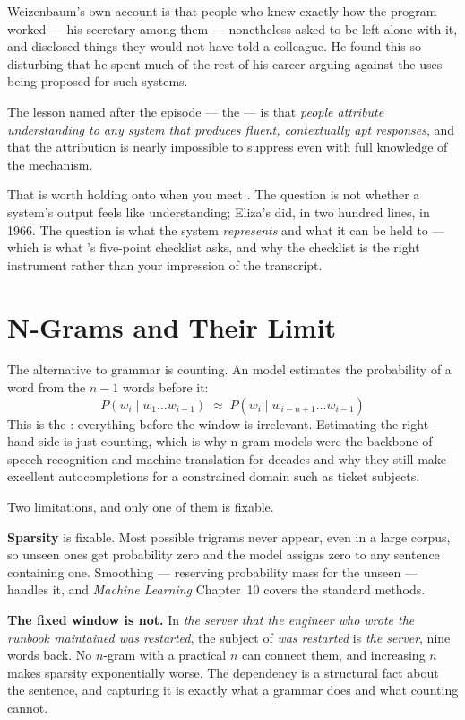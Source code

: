 \begin{alertbox}
Weizenbaum's own account is that people who knew exactly how the program worked ---
his secretary among them --- nonetheless asked to be left alone with it, and
disclosed things they would not have told a colleague. He found this so disturbing
that he spent much of the rest of his career arguing against the uses being proposed
for such systems.

The lesson named after the episode --- the  --- is that
\emph{people attribute understanding to any system that produces fluent,
contextually apt responses}, and that the attribution is nearly impossible to
suppress even with full knowledge of the mechanism.

That is worth holding onto when you meet . The question is not whether
a system's output feels like understanding; Eliza's did, in two hundred lines, in
1966. The question is what the system \emph{represents} and what it can be held to
--- which is what 's five-point checklist asks, and why the
checklist is the right instrument rather than your impression of the transcript.
\end{alertbox}

\section{N-Grams and Their Limit}

The alternative to grammar is counting. An  model estimates the
probability of a word from the $n-1$ words before it:
\[
  P(w_{i} \mid w_{1} \ldots w_{i-1}) \;\approx\;
  P(w_{i} \mid w_{i-n+1} \ldots w_{i-1})
\]
This is the : everything before the window is irrelevant.
Estimating the right-hand side is just counting, which is why n-gram models were
the backbone of speech recognition and machine translation for decades and why they
still make excellent autocompletions for a constrained domain such as ticket
subjects.

Two limitations, and only one of them is fixable.

\textbf{Sparsity} is fixable. Most possible trigrams never appear, even in a large
corpus, so unseen ones get probability zero and the model assigns zero to any
sentence containing one. Smoothing --- reserving probability mass for the unseen ---
handles it, and \emph{Machine Learning} Chapter~10 covers the standard methods.

\textbf{The fixed window is not.} In
\emph{the server that the engineer who wrote the runbook maintained was restarted},
the subject of \emph{was restarted} is \emph{the server}, nine words back. No
$n$-gram with a practical $n$ can connect them, and increasing $n$ makes sparsity
exponentially worse. The dependency is a structural fact about the sentence, and
capturing it is exactly what a grammar does and what counting cannot.

